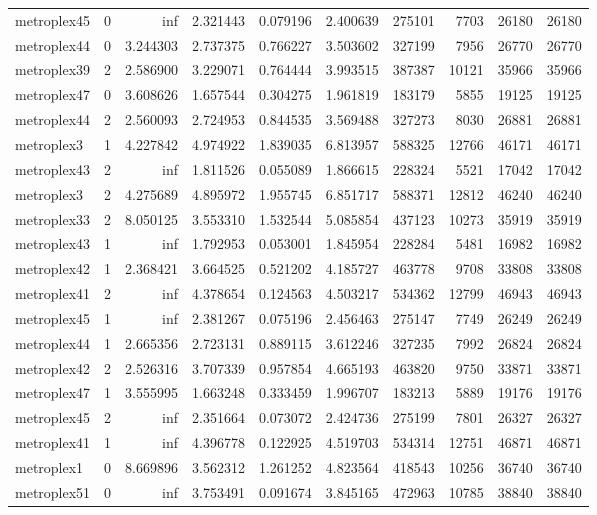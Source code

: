 \documentclass[../../../thesis.tex]{subfiles}
\begin{document}
\begin{longtable}{|l|r|r|r|r|r|r|r|r|r|}
metroplex45 & 0 & inf & 2.321443 & 0.079196 & 2.400639 & 275101 & 7703 & 26180 & 26180 \\
metroplex44 & 0 & 3.244303 & 2.737375 & 0.766227 & 3.503602 & 327199 & 7956 & 26770 & 26770 \\
metroplex39 & 2 & 2.586900 & 3.229071 & 0.764444 & 3.993515 & 387387 & 10121 & 35966 & 35966 \\
metroplex47 & 0 & 3.608626 & 1.657544 & 0.304275 & 1.961819 & 183179 & 5855 & 19125 & 19125 \\
metroplex44 & 2 & 2.560093 & 2.724953 & 0.844535 & 3.569488 & 327273 & 8030 & 26881 & 26881 \\
metroplex3 & 1 & 4.227842 & 4.974922 & 1.839035 & 6.813957 & 588325 & 12766 & 46171 & 46171 \\
metroplex43 & 2 & inf & 1.811526 & 0.055089 & 1.866615 & 228324 & 5521 & 17042 & 17042 \\
metroplex3 & 2 & 4.275689 & 4.895972 & 1.955745 & 6.851717 & 588371 & 12812 & 46240 & 46240 \\
metroplex33 & 2 & 8.050125 & 3.553310 & 1.532544 & 5.085854 & 437123 & 10273 & 35919 & 35919 \\
metroplex43 & 1 & inf & 1.792953 & 0.053001 & 1.845954 & 228284 & 5481 & 16982 & 16982 \\
metroplex42 & 1 & 2.368421 & 3.664525 & 0.521202 & 4.185727 & 463778 & 9708 & 33808 & 33808 \\
metroplex41 & 2 & inf & 4.378654 & 0.124563 & 4.503217 & 534362 & 12799 & 46943 & 46943 \\
metroplex45 & 1 & inf & 2.381267 & 0.075196 & 2.456463 & 275147 & 7749 & 26249 & 26249 \\
metroplex44 & 1 & 2.665356 & 2.723131 & 0.889115 & 3.612246 & 327235 & 7992 & 26824 & 26824 \\
metroplex42 & 2 & 2.526316 & 3.707339 & 0.957854 & 4.665193 & 463820 & 9750 & 33871 & 33871 \\
metroplex47 & 1 & 3.555995 & 1.663248 & 0.333459 & 1.996707 & 183213 & 5889 & 19176 & 19176 \\
metroplex45 & 2 & inf & 2.351664 & 0.073072 & 2.424736 & 275199 & 7801 & 26327 & 26327 \\
metroplex41 & 1 & inf & 4.396778 & 0.122925 & 4.519703 & 534314 & 12751 & 46871 & 46871 \\
metroplex1 & 0 & 8.669896 & 3.562312 & 1.261252 & 4.823564 & 418543 & 10256 & 36740 & 36740 \\
metroplex51 & 0 & inf & 3.753491 & 0.091674 & 3.845165 & 472963 & 10785 & 38840 & 38840 \\

\end{longtable}
\end{document}
